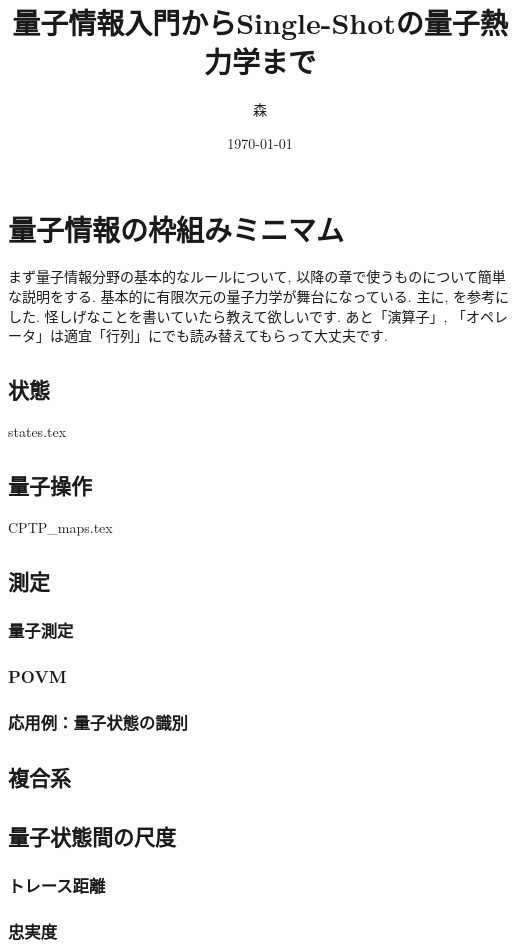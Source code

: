 \documentclass[report]{jlreq}
\title{量子情報入門からSingle-Shotの量子熱力学まで}
\author{森}
\date{\today}
\begin{document}
\maketitle

\setcounter{tocdepth}{1}
\thispagestyle{TOC}
\tableofcontents


\pagestyle{mystyle}
\chapter{量子情報の枠組みミニマム}
まず量子情報分野の基本的なルールについて, 以降の章で使うものについて簡単な説明をする. 
基本的に有限次元の量子力学が舞台になっている. 
主に\cite{nielsen2010quantum}, \cite{SagawaEntropy}を参考にした. 
怪しげなことを書いていたら教えて欲しいです. 
あと「演算子」, 「オペレータ」は適宜「行列」にでも読み替えてもらって大丈夫です. 
\section{状態}
{states.tex}
\section{量子操作}
{CPTP_maps.tex}
\section{測定}
\subsection{量子測定}
\subsection{POVM}
\subsection{応用例：量子状態の識別}
\section{複合系}
\section{量子状態間の尺度}
\subsection{トレース距離}
\subsection{忠実度}
\end{document}
